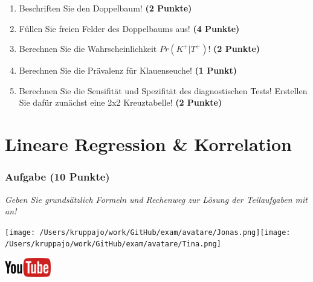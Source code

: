 \documentclass[a4paper, 9pt]{scrartcl}\usepackage[]{graphicx}\usepackage[]{xcolor}
\begin{document}
\begin{enumerate}
\item Beschriften Sie den Doppelbaum! \textbf{(2 Punkte)}
\item Füllen Sie freien Felder des Doppelbaums aus! \textbf{(4 Punkte)}
\item Berechnen Sie die Wahrscheinlichkeit $Pr(K^+|T^+)$! \textbf{(2 Punkte)}
\item Berechnen Sie die Prävalenz für Klauenseuche! \textbf{(1 Punkt)}
\item Berechnen Sie die Sensifität und Spezifität des diagnostischen Tests! Erstellen Sie dafür zunächst eine 2x2 Kreuztabelle! \textbf{(2 Punkte)}
\end{enumerate}

 





 
\clearpage
\part{Lineare Regression \& Korrelation}

\section{Aufgabe \hfill (10 Punkte)}

\textit{Geben Sie grundsätzlich Formeln und Rechenweg zur Lösung der Teilaufgaben mit an!} \\[1Ex]
 

 
\begin{minipage}[t]{0.5\textwidth}
\texttt{[image: /Users/kruppajo/work/GitHub/exam/avatare/Jonas.png]}\hspace{-4mm}\texttt{[image: /Users/kruppajo/work/GitHub/exam/avatare/Tina.png]}
\end{minipage}
\begin{minipage}[t]{0.5\textwidth}
\hfill
\href{https://youtu.be/kHmfEmU6lrk}{\includegraphics[width = 2cm]{img/youtube}}
\end{minipage}
\vspace{1ex}
\end{document}
